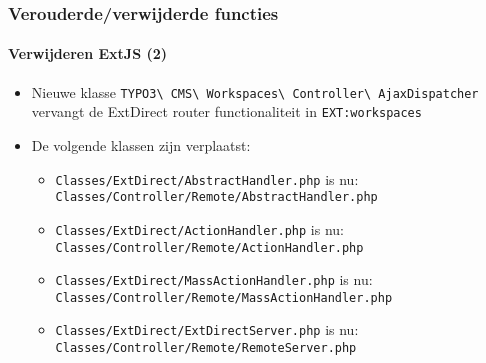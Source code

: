 \begin{frame}[fragile]
	\frametitle{Verouderde/verwijderde functies}
	\framesubtitle{Verwijderen ExtJS (2)}

	\begin{itemize}
		\item Nieuwe klasse
			\texttt{TYPO3\textbackslash
				CMS\textbackslash
				Workspaces\textbackslash
				Controller\textbackslash
				AjaxDispatcher}
			vervangt de ExtDirect router functionaliteit in \texttt{EXT:workspaces}

		\item De volgende klassen zijn verplaatst:

		\begin{itemize}
			\item \smaller\texttt{Classes/ExtDirect/AbstractHandler.php}\newline
				is nu: \texttt{Classes/Controller/Remote/AbstractHandler.php}\normalsize

			\item \smaller\texttt{Classes/ExtDirect/ActionHandler.php}\newline
				is nu: \texttt{Classes/Controller/Remote/ActionHandler.php}\normalsize

			\item \smaller\texttt{Classes/ExtDirect/MassActionHandler.php}\newline
				is nu: \texttt{Classes/Controller/Remote/MassActionHandler.php}\normalsize

			\item \smaller\texttt{Classes/ExtDirect/ExtDirectServer.php}\newline
				is nu: \texttt{Classes/Controller/Remote/RemoteServer.php}\normalsize

		\end{itemize}

	\end{itemize}

\end{frame}
